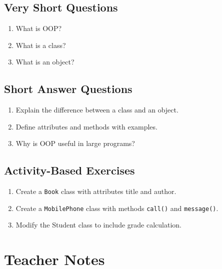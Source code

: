 \subsection{Very Short Questions}

\begin{enumerate}
    \item What is OOP?
    \item What is a class?
    \item What is an object?
\end{enumerate}

\subsection{Short Answer Questions}

\begin{enumerate}
    \item Explain the difference between a class and an object.
    \item Define attributes and methods with examples.
    \item Why is OOP useful in large programs?
\end{enumerate}

\subsection{Activity-Based Exercises}

\begin{enumerate}
    \item Create a \texttt{Book} class with attributes title and author.
    \item Create a \texttt{MobilePhone} class with methods \texttt{call()} and \texttt{message()}.
    \item Modify the Student class to include grade calculation.
\end{enumerate}

\section{Teacher Notes}

